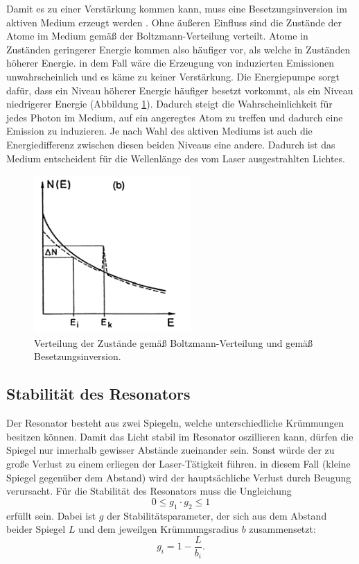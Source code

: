 Damit es zu einer Verstärkung kommen kann, muss eine Besetzungsinversion im aktiven Medium erzeugt werden . Ohne äußeren Einfluss sind die Zustände der Atome im Medium gemäß der Boltzmann-Verteilung verteilt. Atome in Zuständen geringerer Energie kommen also häufiger vor, als welche in Zuständen höherer Energie. in dem Fall wäre die Erzeugung von induzierten Emissionen unwahrscheinlich und es käme zu keiner Verstärkung.
Die Energiepumpe sorgt dafür, dass ein Niveau höherer Energie häufiger besetzt vorkommt, als ein Niveau niedrigerer Energie (Abbildung \ref{fig:inv}). Dadurch steigt die Wahrscheinlichkeit für jedes Photon im Medium, auf ein angeregtes Atom zu treffen und dadurch eine Emission zu induzieren. Je nach Wahl des aktiven Mediums ist auch die Energiedifferenz zwischen diesen beiden Niveaus eine andere. Dadurch ist das Medium entscheident für die Wellenlänge des vom Laser ausgestrahlten Lichtes.

\begin{figure}
    \centering
    \includegraphics[width=6cm]{Bilder/Inversion.PNG}
    \caption{Verteilung der Zustände gemäß Boltzmann-Verteilung und gemäß Besetzungsinversion.\cite{Laserspektroskopie_1}}
    \label{fig:inv}
\end{figure}

\subsection{Stabilität des Resonators}
Der Resonator besteht aus zwei Spiegeln, welche unterschiedliche Krümmungen besitzen können. Damit das Licht stabil im Resonator oszillieren kann, dürfen die Spiegel nur innerhalb gewisser Abstände zueinander sein. Sonst würde der zu große Verlust zu einem erliegen der Laser-Tätigkeit führen. in diesem Fall (kleine Spiegel gegenüber dem Abstand) wird der hauptsächliche Verlust durch Beugung verursacht.
Für die Stabilität des Resonators muss die Ungleichung
\begin{equation}
    \label{eqn:g}
   0 \leq g_1 \cdot g_2 \leq 1
\end{equation}
erfüllt sein. Dabei ist $g$ der Stabilitätsparameter, der sich aus dem Abstand beider Spiegel $L$ und dem jeweilgen Krümmungsradius $b$ zusammensetzt:
\begin{equation}
    g_i = 1-\frac{L}{b_i}.
\end{equation}

